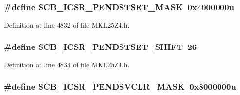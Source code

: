 \subsubsection[{\texorpdfstring{S\+C\+B\+\_\+\+I\+C\+S\+R\+\_\+\+P\+E\+N\+D\+S\+T\+S\+E\+T\+\_\+\+M\+A\+SK}{SCB_ICSR_PENDSTSET_MASK}}]{\setlength{\rightskip}{0pt plus 5cm}\#define S\+C\+B\+\_\+\+I\+C\+S\+R\+\_\+\+P\+E\+N\+D\+S\+T\+S\+E\+T\+\_\+\+M\+A\+SK~0x4000000u}\hypertarget{group___s_c_b___register___masks_gaec656bf7e4d2fdcacfe0ef3e16397a04}{}\label{group___s_c_b___register___masks_gaec656bf7e4d2fdcacfe0ef3e16397a04}


Definition at line 4832 of file M\+K\+L25\+Z4.\+h.

\subsubsection[{\texorpdfstring{S\+C\+B\+\_\+\+I\+C\+S\+R\+\_\+\+P\+E\+N\+D\+S\+T\+S\+E\+T\+\_\+\+S\+H\+I\+FT}{SCB_ICSR_PENDSTSET_SHIFT}}]{\setlength{\rightskip}{0pt plus 5cm}\#define S\+C\+B\+\_\+\+I\+C\+S\+R\+\_\+\+P\+E\+N\+D\+S\+T\+S\+E\+T\+\_\+\+S\+H\+I\+FT~26}\hypertarget{group___s_c_b___register___masks_ga048d1683c88c61f80f5c80173bf5e981}{}\label{group___s_c_b___register___masks_ga048d1683c88c61f80f5c80173bf5e981}


Definition at line 4833 of file M\+K\+L25\+Z4.\+h.

\subsubsection[{\texorpdfstring{S\+C\+B\+\_\+\+I\+C\+S\+R\+\_\+\+P\+E\+N\+D\+S\+V\+C\+L\+R\+\_\+\+M\+A\+SK}{SCB_ICSR_PENDSVCLR_MASK}}]{\setlength{\rightskip}{0pt plus 5cm}\#define S\+C\+B\+\_\+\+I\+C\+S\+R\+\_\+\+P\+E\+N\+D\+S\+V\+C\+L\+R\+\_\+\+M\+A\+SK~0x8000000u}\hypertarget{group___s_c_b___register___masks_ga12a45a6af09cbefd431d033d8411220e}{}\label{group___s_c_b___register___masks_ga12a45a6af09cbefd431d033d8411220e}


